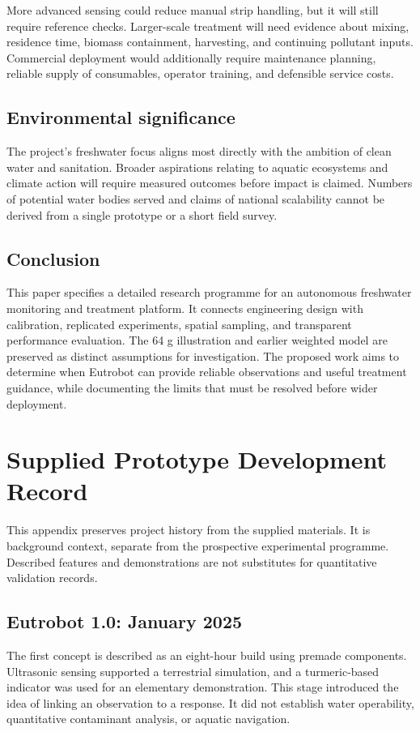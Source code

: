\documentclass[12pt,a4paper]{article}
\newcommand{\papersection}[1]{\clearpage\section{#1}}
\begin{document}
More advanced sensing could reduce manual strip handling, but it will still require reference checks. Larger-scale treatment will need evidence about mixing, residence time, biomass containment, harvesting, and continuing pollutant inputs. Commercial deployment would additionally require maintenance planning, reliable supply of consumables, operator training, and defensible service costs.

\subsection{Environmental significance}
The project's freshwater focus aligns most directly with the ambition of clean water and sanitation. Broader aspirations relating to aquatic ecosystems and climate action will require measured outcomes before impact is claimed. Numbers of potential water bodies served and claims of national scalability cannot be derived from a single prototype or a short field survey.

\subsection{Conclusion}
This paper specifies a detailed research programme for an autonomous freshwater monitoring and treatment platform. It connects engineering design with calibration, replicated experiments, spatial sampling, and transparent performance evaluation. The 64 g illustration and earlier weighted model are preserved as distinct assumptions for investigation. The proposed work aims to determine when Eutrobot can provide reliable observations and useful treatment guidance, while documenting the limits that must be resolved before wider deployment.

\appendix
\papersection{Supplied Prototype Development Record}
This appendix preserves project history from the supplied materials. It is background context, separate from the prospective experimental programme. Described features and demonstrations are not substitutes for quantitative validation records.

\subsection{Eutrobot 1.0: January 2025}
The first concept is described as an eight-hour build using premade components. Ultrasonic sensing supported a terrestrial simulation, and a turmeric-based indicator was used for an elementary demonstration. This stage introduced the idea of linking an observation to a response. It did not establish water operability, quantitative contaminant analysis, or aquatic navigation.
\end{document}
